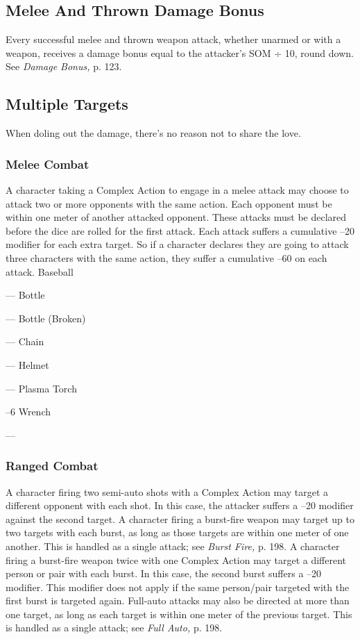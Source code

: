 \subsection{Melee And Thrown Damage Bonus}

Every successful melee and thrown weapon attack, 
whether unarmed or with a weapon, receives a damage 
bonus equal to the attacker's SOM ÷ 10, round down. 
See \textit{Damage Bonus,} p. 123.

\subsection{Multiple Targets}

When doling out the damage, there's no reason not to 
share the love.

\subsubsection{Melee Combat}

A character taking a Complex Action to engage in a 
melee attack may choose to attack two or more opponents
with the same action. Each opponent must be
within one meter of another attacked opponent. These 
attacks must be declared before the dice are rolled for 
the first attack. Each attack suffers a cumulative –20 
modifier for each extra target. So if a character declares 
they are going to attack three characters with the same 
action, they suffer a cumulative –60 on each attack.
Baseball

—
Bottle

—
Bottle (Broken)

—
Chain

—
Helmet

—
Plasma Torch

–6
Wrench

—

\subsubsection{Ranged Combat}

A character firing two semi-auto shots with a Complex 
Action may target a different opponent with each shot. 
In this case, the attacker suffers a –20 modifier against 
the second target.
A character firing a burst-fire weapon may target up 
to two targets with each burst, as long as those targets 
are within one meter of one another. This is handled 
as a single attack; see \textit{Burst Fire,} p. 198.
A character firing a burst-fire weapon twice with 
one Complex Action may target a different person or 
pair with each burst. In this case, the second burst 
suffers a –20 modifier. This modifier does not apply 
if the same person/pair targeted with the first burst is 
targeted again.
Full-auto attacks may also be directed at more than 
one target, as long as each target is within one meter 
of the previous target. This is handled as a single 
attack; see \textit{Full Auto,} p. 198.

